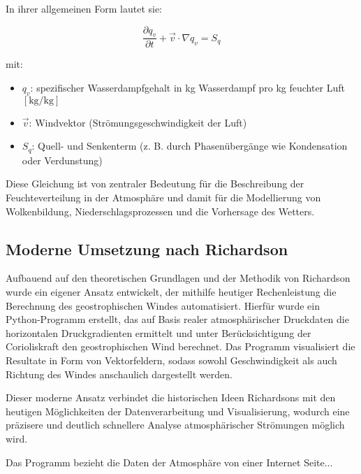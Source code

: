 In ihrer allgemeinen Form lautet sie:

\begin{equation}
\frac{\partial q_v}{\partial t} + \vec{v} \cdot \nabla q_v = S_q
\tag{19.10}
\end{equation}

mit:  
\begin{itemize}
    \item $q_v$: spezifischer Wasserdampfgehalt in kg Wasserdampf pro kg feuchter Luft $[\mathrm{kg/kg}]$
    \item $\vec{v}$: Windvektor (Strömungsgeschwindigkeit der Luft)
    \item $S_q$: Quell- und Senkenterm (z. B. durch Phasenübergänge wie Kondensation oder Verdunstung)
\end{itemize}

Diese Gleichung ist von zentraler Bedeutung für die Beschreibung der Feuchteverteilung in der Atmosphäre und damit für die Modellierung von Wolkenbildung, Niederschlagsprozessen und die Vorhersage des Wetters.


\subsection{Moderne Umsetzung nach Richardson} 

Aufbauend auf den theoretischen Grundlagen und der Methodik von Richardson wurde ein eigener Ansatz entwickelt, der mithilfe heutiger Rechenleistung die Berechnung des geostrophischen Windes automatisiert.
Hierfür wurde ein Python-Programm erstellt, das auf Basis realer atmosphärischer Druckdaten die horizontalen Druckgradienten ermittelt und unter Berücksichtigung der Corioliskraft den geostrophischen Wind berechnet.
Das Programm visualisiert die Resultate in Form von Vektorfeldern, sodass sowohl Geschwindigkeit als auch Richtung des Windes anschaulich dargestellt werden.

Dieser moderne Ansatz verbindet die historischen Ideen Richardsons mit den heutigen Möglichkeiten der Datenverarbeitung und Visualisierung, wodurch eine präzisere und deutlich schnellere Analyse atmosphärischer Strömungen möglich wird.

Das Programm bezieht die Daten der Atmosphäre von einer Internet Seite...

